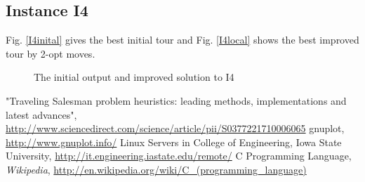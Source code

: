 \documentclass[11pt]{article}
\begin{document}
\subsection{Instance I4}
Fig. \ref{I4inital} gives the best initial tour and Fig. \ref{I4local} shows the best improved tour by 2-opt moves.
\begin{figure}[ht]
\centering
{}
\caption{The initial output and improved solution to I4}
\label{fig:Comparison} %
\end{figure}

\begin{thebibliography}%
\small
{} "Traveling Salesman problem heuristics: leading methods, implementations and latest advances", \url{http://www.sciencedirect.com/science/article/pii/S0377221710006065}%
 gnuplot, \url{http://www.gnuplot.info/}
 Linux Servers in College of Engineering, Iowa State University, \url{http://it.engineering.iastate.edu/remote/}
 C Programming Language, \textit{Wikipedia}, \url{http://en.wikipedia.org/wiki/C_(programming_language)}
\end{thebibliography}
\end{document}
